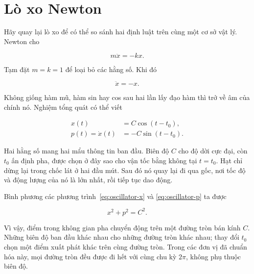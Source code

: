 \begin{classroomqa}
\end{classroomqa}

\section{Lò xo Newton}

Hãy quay lại lò xo để có thể so sánh hai định luật trên cùng một cơ sở vật lý. Newton cho

\begin{equation}
  m\ddot x=-kx.
  \label{eq:newton-spring}
\end{equation}

Tạm đặt \(m=k=1\) để loại bỏ các hằng số. Khi đó

\begin{equation}
  \ddot x=-x.
  \label{eq:normalized-oscillator}
\end{equation}

Không giống hàm mũ, hàm sin hay cos sau hai lần lấy đạo hàm thì trở về âm của chính nó. Nghiệm tổng quát có thể viết

\begin{align}
  x(t)&=C\cos(t-t_0),
  \label{eq:oscillator-x}\\
  p(t)=\dot x(t)&=-C\sin(t-t_0).
  \label{eq:oscillator-p}
\end{align}

Hai hằng số mang hai mẩu thông tin ban đầu. Biên độ \(C\) cho độ dời cực đại, còn \(t_0\) ấn định pha, được chọn ở đây sao cho vận tốc bằng không tại \(t=t_0\). Hạt chỉ dừng lại trong chốc lát ở hai đầu mút. Sau đó nó quay lại đi qua gốc, nơi tốc độ và động lượng của nó là lớn nhất, rồi tiếp tục dao động.

Bình phương các phương trình~\eqref{eq:oscillator-x} và \eqref{eq:oscillator-p} ta được

\begin{equation}
  x^2+p^2=C^2.
  \label{eq:oscillator-phase-circle}
\end{equation}

Vì vậy, điểm trong không gian pha chuyển động trên một đường tròn bán kính \(C\). Những biên độ ban đầu khác nhau cho những đường tròn khác nhau; thay đổi \(t_0\) chọn một điểm xuất phát khác trên cùng đường tròn. Trong các đơn vị đã chuẩn hóa này, mọi đường tròn đều được đi hết với cùng chu kỳ \(2\pi\), không phụ thuộc biên độ.

